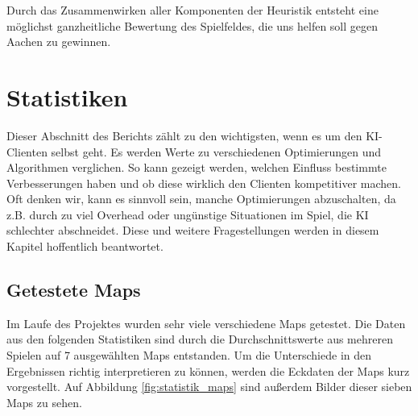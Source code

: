 \documentclass[12pt,a4paper,bibliography=totocnumbered,listof=totocnumbered]{scrartcl}
\begin{document}
	Durch das Zusammenwirken aller Komponenten der Heuristik entsteht eine möglichst ganzheitliche Bewertung des Spielfeldes, die uns helfen soll gegen Aachen zu gewinnen.

    \newpage
    \section{Statistiken}
    \vspace{1em}
	Dieser Abschnitt des Berichts zählt zu den wichtigsten, wenn es um den KI-Clienten selbst geht. Es werden Werte zu verschiedenen Optimierungen und Algorithmen verglichen. So kann gezeigt werden, welchen Einfluss bestimmte \grqq Verbesserungen\glqq{} haben und ob diese wirklich den Clienten kompetitiver machen. Oft denken wir, kann es sinnvoll sein, manche Optimierungen abzuschalten, da z.B. durch zu viel Overhead oder ungünstige Situationen im Spiel, die KI schlechter abschneidet. Diese und weitere Fragestellungen werden in diesem Kapitel hoffentlich beantwortet.\newline

	\subsection{Getestete Maps}
	\vspace{1em}
	Im Laufe des Projektes wurden sehr viele verschiedene Maps getestet. Die Daten aus den folgenden Statistiken sind durch die Durchschnittswerte aus mehreren Spielen auf 7 ausgewählten Maps entstanden. Um die Unterschiede in den Ergebnissen richtig interpretieren zu können, werden die Eckdaten der Maps kurz vorgestellt. Auf Abbildung \ref{fig:statistik_maps} sind außerdem Bilder dieser sieben Maps zu sehen.
	
\end{document}
